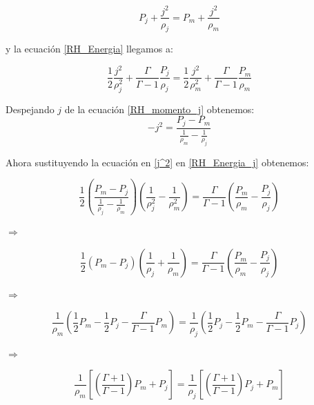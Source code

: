 \documentclass[12pt,a4paper]{book}
\begin{document}
\begin{equation}\label{RH_momento_j}
P_{j}+\frac{j^2}{\rho_{j}}=P_{m}+\frac{j^2}{\rho_{m}}
\end{equation}

y la ecuación \ref{RH_Energia} llegamos a:

\begin{equation}\label{RH_Energia_j}
\frac{1}{2} \frac{j^{2}}{\rho_{j}^2}+\frac{\Gamma}{\Gamma-1} \frac{P_{j}}{\rho_{j}}=
\frac{1}{2} \frac{j^{2}}{\rho_{m}^2}+\frac{\Gamma}{\Gamma-1} \frac{P_{m}}{\rho_{m}}
\end{equation}

Despejando $j$ de la ecuación \ref{RH_momento_j} obtenemos:
\begin{equation}\label{j^2}
-j^{2}=\frac{P_{j}-P_{m}}{\frac{1}{\rho_{m}}-\frac{1}{\rho_{j}}}
\end{equation}

Ahora sustituyendo la ecuación en \ref{j^2} en \ref{RH_Energia_j} obtenemos:

\begin{equation*}
\frac{1}{2} \left( \frac{P_{m}-P_{j}}{\frac{1}{\rho_{j}}-\frac{1}{\rho_{m}}} \right)
\left(\frac{1}{\rho_{j}^{2}}-\frac{1}{\rho_{m}^{2}} \right)
=
\frac{\Gamma}{\Gamma-1}
\left( \frac{P_{m}}{\rho_{m}}-\frac{P_{j}}{\rho_{j}} \right)
\end{equation*}

$\Rightarrow$

\begin{equation*}
\frac{1}{2}	\left( P_{m} - P_{j} \right)
\left( \frac{1}{\rho_{j}}+\frac{1}{\rho_{m}} \right)
=
\frac{\Gamma}{\Gamma-1}
\left( \frac{P_{m}}{\rho_{m}}-\frac{P_{j}}{\rho_{j}} \right)
\end{equation*}

$\Rightarrow$

\begin{equation*}
\frac{1}{\rho_{m}} \left( \frac{1}{2} P_{m}- \frac{1}{2} P_{j}-
\frac{\Gamma}{\Gamma-1} P_{m} \right)
=
\frac{1}{\rho_{j}} \left( \frac{1}{2} P_{j}- \frac{1}{2} P_{m}-
\frac{\Gamma}{\Gamma-1} P_{j} \right)
\end{equation*}

$\Rightarrow$

\begin{equation*}
\frac{1}{\rho_{m}} \left[  \left(\frac{\Gamma + 1}{\Gamma - 1} \right) P_{m} + P_{j} \right]
=
\frac{1}{\rho_{j}} \left[  \left(\frac{\Gamma + 1}{\Gamma - 1} \right) P_{j} + P_{m} \right]
\end{equation*}
\end{document}

